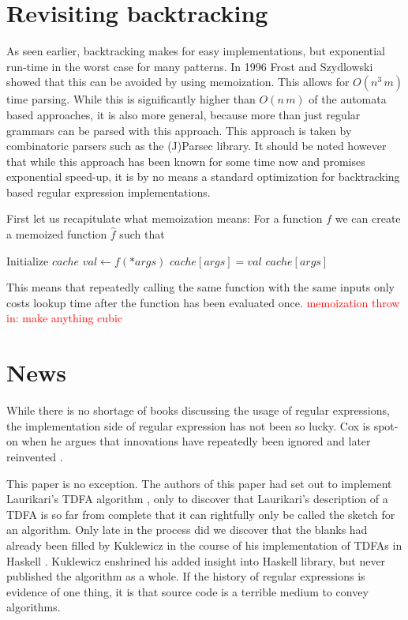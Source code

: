 \documentclass[11pt]{Thesis}
\theoremstyle{definition}
\newcommand{\nes}[1]{\textcolor{red}{#1}}
\begin{document}
\section{Revisiting backtracking}
As seen earlier, backtracking makes for easy implementations, but exponential 
run-time in the worst case for many patterns. In 1996 Frost and
Szydlowski\cite{Fros96a} showed that this can be avoided by using memoization.
This allows for $O(n^3\, m)$ time parsing. While this is significantly higher
than $O(n\, m)$ of the automata based approaches, it is also more general,
because more than just regular grammars can be parsed with this approach. 
This approach is taken by combinatoric parsers such as the (J)Parsec library.
It should be noted however that while this approach has been known for some 
time now and promises exponential speed-up, it is by no means a standard
optimization for backtracking based regular expression implementations.

First let us recapitulate what memoization means: For a function $f$ we can 
create a memoized function $\hat f$ such that
\begin{algorithmic}
  \State Initialize $cache$
  \State $val\leftarrow f(*args)$
  \State $cache[args] = val$
  \EndIf
  \State \Return $cache[args]$
  \EndFunction
\end{algorithmic}
This means that repeatedly calling the same function with  the same inputs 
only costs lookup time after the function has been evaluated once.
\nes{memoization throw in: make anything cubic } 

\section{News} %
While there is no shortage of books discussing the usage of regular
expressions, the implementation side of regular expression has not
been so lucky. Cox is spot-on when he argues that innovations have
repeatedly been ignored and later reinvented \cite{Cox07a,Cox09a,Cox10a}. 

This paper is no exception. The authors of this paper had set out
to implement Laurikari's TDFA algorithm \cite{Laur00a},
only to discover that Laurikari's description of a TDFA is so far
from complete that it can rightfully only be called the sketch for
an algorithm. Only late in the process did we discover that the blanks
had already been filled by Kuklewicz in the course of his implementation
of TDFAs in Haskell \cite{Kukl07a}. Kuklewicz enshrined his
added insight into Haskell library, but never published the algorithm
as a whole. If the history of regular expressions is evidence of one
thing, it is that source code is a terrible medium to convey algorithms. 
\end{document}

